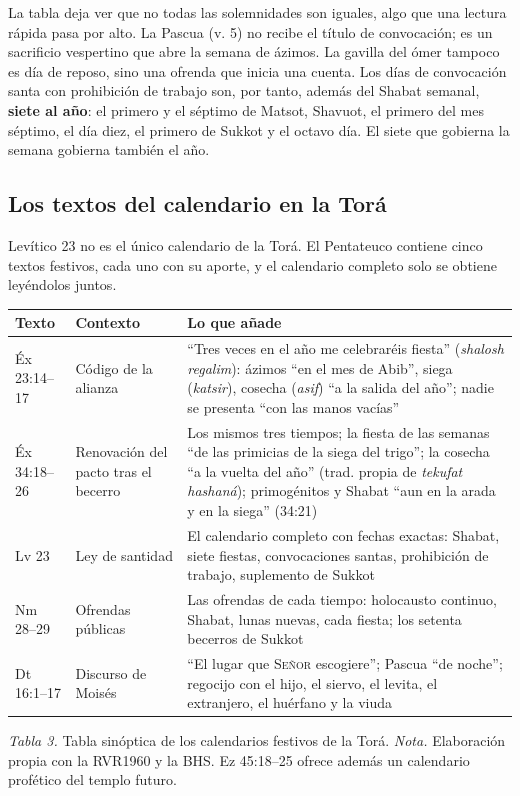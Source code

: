 \documentclass[11pt,letterpaper]{article}
\newcommand{\SENOR}{\textsc{Señor}}
\newcommand{\destacar}[1]{\textbf{\textcolor{tierraroja}{#1}}}
\begin{document}
La tabla deja ver que no todas las solemnidades son iguales, algo que una lectura rápida pasa por alto. La Pascua (v. 5) no recibe el título de convocación; es un sacrificio vespertino que abre la semana de ázimos. La gavilla del ómer tampoco es día de reposo, sino una ofrenda que inicia una cuenta. Los días de convocación santa con prohibición de trabajo son, por tanto, además del Shabat semanal, \destacar{siete al año}: el primero y el séptimo de Matsot, Shavuot, el primero del mes séptimo, el día diez, el primero de Sukkot y el octavo día. El siete que gobierna la semana gobierna también el año.

\subsection{Los textos del calendario en la Torá}
Levítico 23 no es el único calendario de la Torá. El Pentateuco contiene cinco textos festivos, cada uno con su aporte, y el calendario completo solo se obtiene leyéndolos juntos.

\begin{center}\small\renewcommand{\arraystretch}{1.18}
\begin{tabular}{@{}L{2.4cm}L{3.6cm}L{9.1cm}@{}}
\toprule
\textbf{Texto} & \textbf{Contexto} & \textbf{Lo que añade} \\ \midrule
Éx 23:14--17 & Código de la alianza & ``Tres veces en el año me celebraréis fiesta'' (\emph{shalosh regalim}): ázimos ``en el mes de Abib'', siega (\emph{katsir}), cosecha (\emph{asif}) ``a la salida del año''; nadie se presenta ``con las manos vacías'' \\
Éx 34:18--26 & Renovación del pacto tras el becerro & Los mismos tres tiempos; la fiesta de las semanas ``de las primicias de la siega del trigo''; la cosecha ``a la vuelta del año'' (trad. propia de \emph{tekufat hashaná}); primogénitos y Shabat ``aun en la arada y en la siega'' (34:21) \\
Lv 23 & Ley de santidad & El calendario completo con fechas exactas: Shabat, siete fiestas, convocaciones santas, prohibición de trabajo, suplemento de Sukkot \\
Nm 28--29 & Ofrendas públicas & Las ofrendas de cada tiempo: holocausto continuo, Shabat, lunas nuevas, cada fiesta; los setenta becerros de Sukkot \\
Dt 16:1--17 & Discurso de Moisés & ``El lugar que \SENOR{} escogiere''; Pascua ``de noche''; regocijo con el hijo, el siervo, el levita, el extranjero, el huérfano y la viuda \\
\bottomrule
\end{tabular}\par
{\footnotesize\color{sepia}\textit{Tabla 3.} Tabla sinóptica de los calendarios festivos de la Torá. \textit{Nota.} Elaboración propia con la RVR1960 y la BHS. Ez 45:18--25 ofrece además un calendario profético del templo futuro.}
\end{center}
\end{document}
